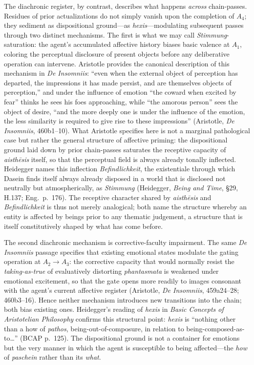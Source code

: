 \documentclass{article}
\begin{document}
The diachronic register, by contrast, describes what happens \textit{across} chain-passes. Residues of prior actualizations do not simply vanish upon the completion of $A_4$; they sediment as dispositional ground---as \textit{hexis}---modulating subsequent passes through two distinct mechanisms. The first is what we may call \textit{Stimmung}-saturation: the agent's accumulated affective history biases basic valence at $A_1$, coloring the perceptual disclosure of present objects before any deliberative operation can intervene. Aristotle provides the canonical description of this mechanism in \textit{De Insomniis}: ``even when the external object of perception has departed, the impressions it has made persist, and are themselves objects of perception,'' and under the influence of emotion ``the coward when excited by fear'' thinks he sees his foes approaching, while ``the amorous person'' sees the object of desire, ``and the more deeply one is under the influence of the emotion, the less similarity is required to give rise to these impressions'' (Aristotle, \textit{De Insomniis}, 460b1--10). What Aristotle specifies here is not a marginal pathological case but rather the general structure of affective priming: the dispositional ground laid down by prior chain-passes saturates the receptive capacity of \textit{aisth\=esis} itself, so that the perceptual field is always already tonally inflected. Heidegger names this inflection \textit{Befindlichkeit}, the existentiale through which Dasein finds itself always already disposed in a world that is disclosed not neutrally but atmospherically, as \textit{Stimmung} (Heidegger, \textit{Being and Time}, \S 29, H.137; Eng.~p.~176). The receptive character shared by \textit{aisth\=esis} and \textit{Befindlichkeit} is thus not merely analogical; both name the structure whereby an entity is affected by beings prior to any thematic judgement, a structure that is itself constitutively shaped by what has come before.

The second diachronic mechanism is corrective-faculty impairment. The same \textit{De Insomniis} passage specifies that existing emotional states modulate the gating operation at $A_2 \rightarrow A_3$: the corrective capacity that would normally resist the \textit{taking-as-true} of evaluatively distorting \textit{phantasmata} is weakened under emotional excitement, so that the gate opens more readily to images consonant with the agent's current affective register (Aristotle, \textit{De Insomniis}, 459a24--28; 460b3--16). Hence neither mechanism introduces new transitions into the chain; both bias existing ones. Heidegger's reading of \textit{hexis} in \textit{Basic Concepts of Aristotelian Philosophy} confirms this structural point: \textit{hexis} is ``nothing other than a how of \textit{pathos}, being-out-of-composure, in relation to being-composed-as-to\ldots'' (BCAP p.~125). The dispositional ground is not a container for emotions but the very manner in which the agent is susceptible to being affected---the \textit{how} of \textit{paschein} rather than its \textit{what}.
\end{document}
